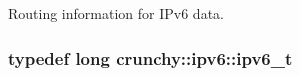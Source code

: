 Routing information for I\+Pv6 data. 

\hypertarget{namespacecrunchy_1_1ipv6_ae8143b1c348e1081a461d0cc25dea6a4}{}
\subsubsection[{ipv6\+\_\+t}]{\setlength{\rightskip}{0pt plus 5cm}typedef long {\bf crunchy\+::ipv6\+::ipv6\+\_\+t}}\label{namespacecrunchy_1_1ipv6_ae8143b1c348e1081a461d0cc25dea6a4}
